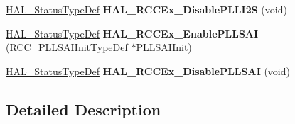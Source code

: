 \begin{DoxyCompactItemize}
\item 
\mbox{\label{group___r_c_c_ex___exported___functions___group1_gafd47e0656151bd2ea5b23e8d25a7cf98}} 
\mbox{\hyperlink{stm32f7xx__hal__def_8h_a63c0679d1cb8b8c684fbb0632743478f}{H\+A\+L\+\_\+\+Status\+Type\+Def}} {\bfseries H\+A\+L\+\_\+\+R\+C\+C\+Ex\+\_\+\+Disable\+P\+L\+L\+I2S} (void)
\item 
\mbox{\label{group___r_c_c_ex___exported___functions___group1_ga1a6563391373a8a2fab5e09dc1ef9209}} 
\mbox{\hyperlink{stm32f7xx__hal__def_8h_a63c0679d1cb8b8c684fbb0632743478f}{H\+A\+L\+\_\+\+Status\+Type\+Def}} {\bfseries H\+A\+L\+\_\+\+R\+C\+C\+Ex\+\_\+\+Enable\+P\+L\+L\+S\+AI} (\mbox{\hyperlink{struct_r_c_c___p_l_l_s_a_i_init_type_def}{R\+C\+C\+\_\+\+P\+L\+L\+S\+A\+I\+Init\+Type\+Def}} $\ast$P\+L\+L\+S\+A\+I\+Init)
\item 
\mbox{\label{group___r_c_c_ex___exported___functions___group1_gad1182235efd169df7de0a0e09cd3766d}} 
\mbox{\hyperlink{stm32f7xx__hal__def_8h_a63c0679d1cb8b8c684fbb0632743478f}{H\+A\+L\+\_\+\+Status\+Type\+Def}} {\bfseries H\+A\+L\+\_\+\+R\+C\+C\+Ex\+\_\+\+Disable\+P\+L\+L\+S\+AI} (void)
\end{DoxyCompactItemize}


\subsection{Detailed Description}
